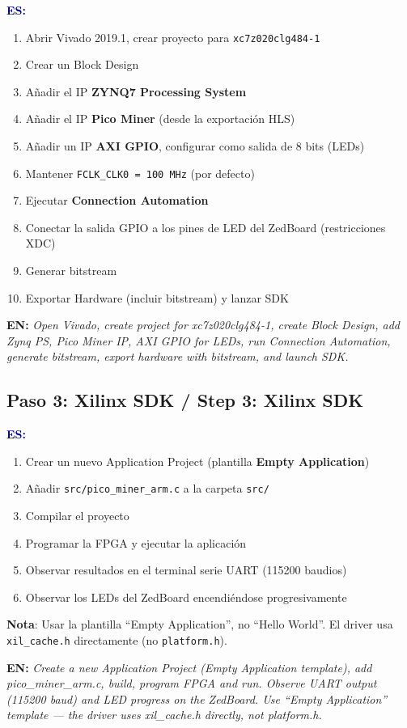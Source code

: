 \documentclass[12pt,a4paper]{article}
\newcommand{\bsubsection}[2]{%
    \subsection{#1 \textnormal{\small\color{accentblue}/ #2}}%
}
\newenvironment{bilingual}{%
    \par\medskip
}{%
    \par\medskip
}
\newcommand{\espara}[1]{\noindent\textcolor{darkblue}{\textbf{ES:}} #1\par\smallskip}
\newcommand{\enpara}[1]{\noindent\textcolor{accentblue}{\textbf{EN:}} \textit{#1}\par\smallskip}
\begin{document}
\begin{bilingual}
\espara{%
\begin{enumerate}[leftmargin=2em]
    \item Abrir Vivado 2019.1, crear proyecto para \texttt{xc7z020clg484-1}
    \item Crear un Block Design
    \item A\~nadir el IP \textbf{ZYNQ7 Processing System}
    \item A\~nadir el IP \textbf{Pico Miner} (desde la exportaci\'on HLS)
    \item A\~nadir un IP \textbf{AXI GPIO}, configurar como salida de 8 bits (LEDs)
    \item Mantener \texttt{FCLK\_CLK0 = 100 MHz} (por defecto)
    \item Ejecutar \textbf{Connection Automation}
    \item Conectar la salida GPIO a los pines de LED del ZedBoard (restricciones XDC)
    \item Generar bitstream
    \item Exportar Hardware (incluir bitstream) y lanzar SDK
\end{enumerate}}

\enpara{%
Open Vivado, create project for xc7z020clg484-1, create Block Design,
add Zynq PS, Pico Miner IP, AXI GPIO for LEDs, run Connection Automation,
generate bitstream, export hardware with bitstream, and launch SDK.}
\end{bilingual}

\bsubsection{Paso 3: Xilinx SDK}{Step 3: Xilinx SDK}

\begin{bilingual}
\espara{%
\begin{enumerate}[leftmargin=2em]
    \item Crear un nuevo Application Project (plantilla \textbf{Empty Application})
    \item A\~nadir \texttt{src/pico\_miner\_arm.c} a la carpeta \texttt{src/}
    \item Compilar el proyecto
    \item Programar la FPGA y ejecutar la aplicaci\'on
    \item Observar resultados en el terminal serie UART (115200 baudios)
    \item Observar los LEDs del ZedBoard encendi\'endose progresivamente
\end{enumerate}
\textbf{Nota}: Usar la plantilla ``Empty Application'', no ``Hello World''.
El driver usa \texttt{xil\_cache.h} directamente (no \texttt{platform.h}).}

\enpara{%
Create a new Application Project (Empty Application template), add
pico\_miner\_arm.c, build, program FPGA and run. Observe UART output (115200
baud) and LED progress on the ZedBoard. Use ``Empty Application'' template ---
the driver uses xil\_cache.h directly, not platform.h.}
\end{bilingual}
\end{document}
